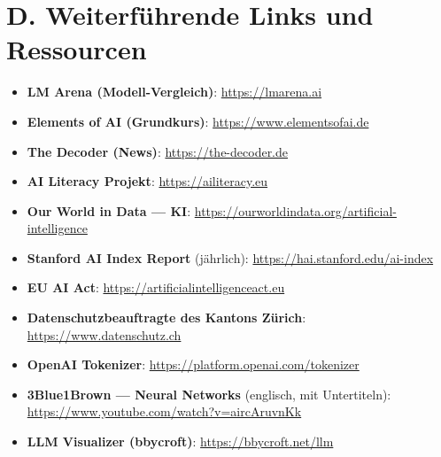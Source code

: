 \section*{D. Weiterführende Links und Ressourcen}

\begin{itemize}
    \item \textbf{LM Arena (Modell-Vergleich)}: \url{https://lmarena.ai}
    \item \textbf{Elements of AI (Grundkurs)}: \url{https://www.elementsofai.de}
    \item \textbf{The Decoder (News)}: \url{https://the-decoder.de}
    \item \textbf{AI Literacy Projekt}: \url{https://ailiteracy.eu}
    \item \textbf{Our World in Data --- KI}: \url{https://ourworldindata.org/artificial-intelligence}
    \item \textbf{Stanford AI Index Report} (jährlich):
          \url{https://hai.stanford.edu/ai-index}
    \item \textbf{EU AI Act}: \url{https://artificialintelligenceact.eu}
    \item \textbf{Datenschutzbeauftragte des Kantons Zürich}: \url{https://www.datenschutz.ch}
    \item \textbf{OpenAI Tokenizer}: \url{https://platform.openai.com/tokenizer}
    \item \textbf{3Blue1Brown --- Neural Networks} (englisch, mit Untertiteln):
          \url{https://www.youtube.com/watch?v=aircAruvnKk}
    \item \textbf{LLM Visualizer (bbycroft)}: \url{https://bbycroft.net/llm}
\end{itemize}
